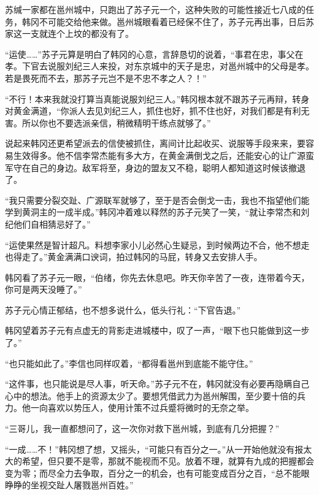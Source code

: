 苏缄一家都在邕州城中，只跑出了苏子元一个，这种失败的可能性接近七八成的任务，韩冈不可能交给他来做。邕州城眼看着已经保不住了，苏子元再出事，日后苏家这一支就连个上坟的都没有了。

“运使……”苏子元算是明白了韩冈的心意，言辞恳切的说着，“事君在忠，事父在孝。下官去说服刘纪三人来投，对东京城中的天子是忠，对邕州城中的父母是孝。若是畏死而不去，那苏子元岂不是不忠不孝之人？！”

“不行！本来我就没打算当真能说服刘纪三人。”韩冈根本就不跟苏子元再辩，转身对黄金满道，“你派人去见刘纪三人，抓住也好，抓不住也好，对我们都是有利无害。所以你也不要选派亲信，稍微精明干练点就够了。”

说起来韩冈还更希望派去的信使被抓住，离间计比起收买、说服等手段来来，要容易生效得多。他不信李常杰能有多大方，在黄金满倒戈之后，还能安心的让广源蛮军守在自己的身边。敌军将至，身边的盟友又不稳，聪明人都知道这时候该撤退了。

“我只需要分裂交趾、广源联军就够了，至于是否会倒戈一击，我也不指望他们能学到黄洞主的一成半成。”韩冈冲着难以释然的苏子元笑了一笑，“就让李常杰和刘纪他们自相猜忌好了。”

“运使果然是智计超凡。料想李家小儿必然心生疑忌，到时候两边不合，他不想走也得走了。”黄金满满口谀词，拍过韩冈的马屁，转身又去安排人手。

韩冈看了苏子元一眼，“伯绪，你先去休息吧。昨天你辛苦了一夜，连带着今天，你可是两天没睡了。”

苏子元心情正郁结，也不想多说什么，低头行礼：“下官告退。”

韩冈望着苏子元有点虚无的背影走进城楼中，叹了一声，“眼下也只能做到这一步了。”

“也只能如此了。”李信也同样叹着，“都得看邕州到底能不能守住。”

“这件事，也只能说是尽人事，听天命。”苏子元不在，韩冈就没有必要再隐瞒自己心中的想法。他手上的资源太少了。要想凭借武力为邕州解围，至少要十倍的兵力。他一向喜欢以势压人，使用计策不过兵蹙将微时的无奈之举。

“三哥儿，我一直都想问了，这一次你对救下邕州城，到底有几分把握？”

“一成……不！”韩冈想了想，又摇头，“可能只有百分之一。”从一开始他就没有报太大的希望，但只要不是零，那就不能视而不见。放着不理，就算有九成的把握都会变为零；而尽全力去争取，百分之一的机会，也有可能变成百分之百，“总不能眼睁睁的坐视交趾人屠戮邕州百姓。”

